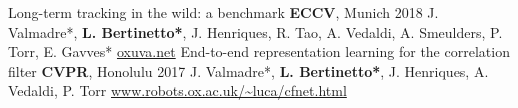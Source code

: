 \begin{cvpapers}
  \cvpapertitle
    {Long-term tracking in the wild: a benchmark} %
    {\textbf{ECCV}, Munich} %
    {2018} %
  \cvpaperauthors
    {J. Valmadre*, \textbf{L. Bertinetto*}, J. Henriques, R. Tao, A. Vedaldi, A. Smeulders, P. Torr, E. Gavves*}
    {} %
    {} %
  \cvpaperurl
    {\href{http://oxuva.net}{oxuva.net}}
    {} %
    {} %
  \cvpapertitle
    {End-to-end representation learning for the correlation filter} %
    {\textbf{CVPR}, Honolulu} %
    {2017} %
  \cvpaperauthors
    {J. Valmadre*, \textbf{L. Bertinetto*}, J. Henriques, A. Vedaldi, P. Torr}
    {} %
    {} %
  \cvpaperurl
    {\href{http://www.robots.ox.ac.uk/~luca/cfnet.html}{www.robots.ox.ac.uk/\textasciitilde luca/cfnet.html}}
    {} %
    {} %

\end{cvpapers}

